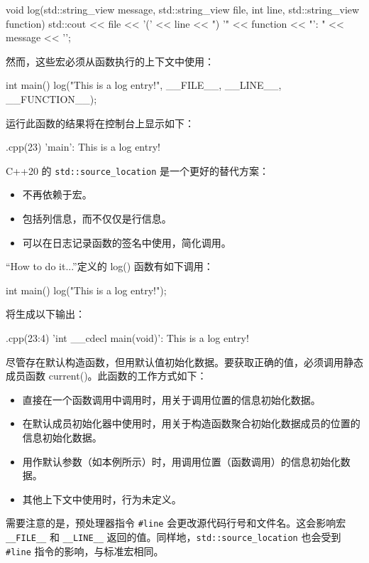 \begin{cpp}
void log(std::string_view message,
         std::string_view file,
         int line,
         std::string_view function)
{
    std::cout << file << '('
              << line << ") '"
              << function << "': "
              << message << '\n';
}
\end{cpp}

然而，这些宏必须从函数执行的上下文中使用：

\begin{cpp}
int main()
{
    log("This is a log entry!", __FILE__, __LINE__, __FUNCTION__);
}
\end{cpp}

运行此函数的结果将在控制台上显示如下：

\begin{shell}
[...]\source.cpp(23) 'main': This is a log entry!
\end{shell}

C++20 的 \verb|std::source_location| 是一个更好的替代方案：

\begin{itemize}
\item
不再依赖于宏。

\item
包括列信息，而不仅仅是行信息。

\item
可以在日志记录函数的签名中使用，简化调用。
\end{itemize}

“How to do it...”定义的 log() 函数有如下调用：

\begin{cpp}
int main()
{
    log("This is a log entry!");
}
\end{cpp}

将生成以下输出：

\begin{shell}
[...]\source.cpp(23:4) 'int __cdecl main(void)': This is a log entry!
\end{shell}

尽管存在默认构造函数，但用默认值初始化数据。要获取正确的值，必须调用静态成员函数 current()。此函数的工作方式如下：

\begin{itemize}
\item
直接在一个函数调用中调用时，用关于调用位置的信息初始化数据。

\item
在默认成员初始化器中使用时，用关于构造函数聚合初始化数据成员的位置的信息初始化数据。

\item
用作默认参数（如本例所示）时，用调用位置（函数调用）的信息初始化数据。

\item
其他上下文中使用时，行为未定义。
\end{itemize}

需要注意的是，预处理器指令 \verb|#line| 会更改源代码行号和文件名。这会影响宏 \verb|__FILE__| 和 \verb|__LINE__| 返回的值。同样地，\verb|std::source_location| 也会受到 \verb|#line| 指令的影响，与标准宏相同。

